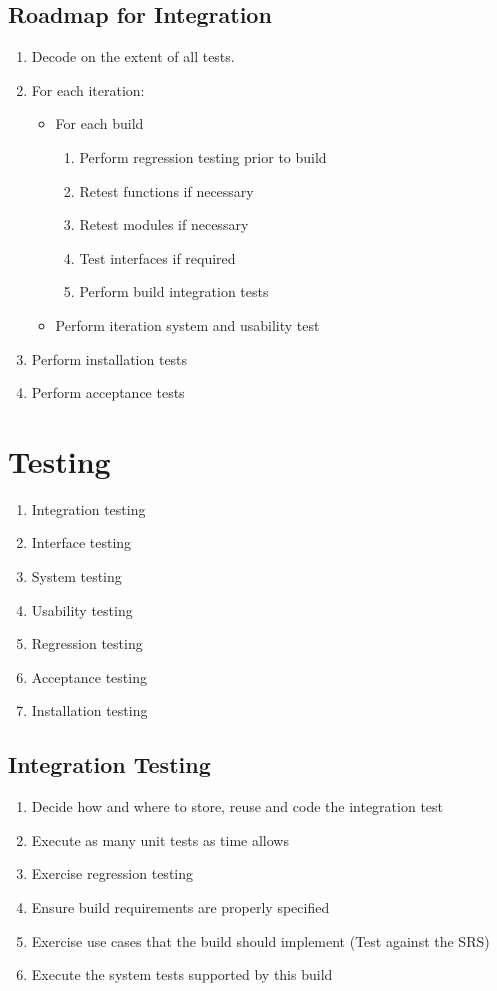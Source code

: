 \documentclass{report}
\begin{document}
			\subsection{Roadmap for Integration}
				\begin{enumerate}
					\item Decode on the extent of all tests.
					\item For each iteration:
						\begin{itemize}
							\item For each build
								\begin{enumerate}
									\item Perform regression testing prior to build
									\item Retest functions if necessary
									\item Retest modules if necessary
									\item Test interfaces if required
									\item Perform build integration tests
								\end{enumerate}
							\item Perform iteration system and usability test
						\end{itemize}
					\item Perform installation tests
					\item Perform acceptance tests
				\end{enumerate}
		\section{Testing}
		    \begin{enumerate}
		    	\item Integration testing
		    	\item Interface testing
		    	\item System testing
		    	\item Usability testing
		    	\item Regression testing
		    	\item Acceptance testing
		    	\item Installation testing
		    \end{enumerate}
			\subsection{Integration Testing}
				\begin{enumerate}
					\item Decide how and where to store, reuse and code the integration test
					\item Execute as many unit tests as time allows
					\item Exercise regression testing
					\item Ensure build requirements are properly specified
					\item Exercise use cases that the build should implement (Test against the SRS)
					\item Execute the system tests supported by this build
				\end{enumerate}
\end{document}

